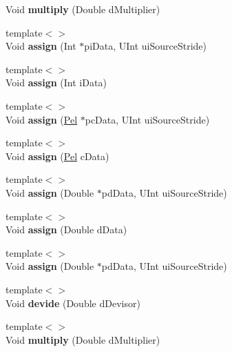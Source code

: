 \begin{DoxyCompactItemize}
\mbox{\label{class_t_ren_image_plane_a2683e03f247a092b64f85d0faabbd030}} 
Void {\bfseries multiply} (Double d\+Multiplier)
\item 
\mbox{\label{class_t_ren_image_plane_a7f27f570150b2743b96889c76ccccaf3}} 
{\footnotesize template$<$$>$ }\\Void {\bfseries assign} (Int $\ast$pi\+Data, U\+Int ui\+Source\+Stride)
\item 
\mbox{\label{class_t_ren_image_plane_a9ac78ccea4fe63cddb4bd99f354246c7}} 
{\footnotesize template$<$$>$ }\\Void {\bfseries assign} (Int i\+Data)
\item 
\mbox{\label{class_t_ren_image_plane_aaee73faf0e840d89aa271ea67e71f5ac}} 
{\footnotesize template$<$$>$ }\\Void {\bfseries assign} (\hyperlink{_type_def_8h_af92141699657699b4b547be0c8517541}{Pel} $\ast$pc\+Data, U\+Int ui\+Source\+Stride)
\item 
\mbox{\label{class_t_ren_image_plane_a4ee1358fe831ce347fadd32b8e6cce35}} 
{\footnotesize template$<$$>$ }\\Void {\bfseries assign} (\hyperlink{_type_def_8h_af92141699657699b4b547be0c8517541}{Pel} c\+Data)
\item 
\mbox{\label{class_t_ren_image_plane_a8b44044a076d0a04290d30fa3db4f78e}} 
{\footnotesize template$<$$>$ }\\Void {\bfseries assign} (Double $\ast$pd\+Data, U\+Int ui\+Source\+Stride)
\item 
\mbox{\label{class_t_ren_image_plane_afb78a2d793ae8042558ed0a171b40d00}} 
{\footnotesize template$<$$>$ }\\Void {\bfseries assign} (Double d\+Data)
\item 
\mbox{\label{class_t_ren_image_plane_ae753b032c765fc46e2602b0bc1f2670f}} 
{\footnotesize template$<$$>$ }\\Void {\bfseries assign} (Double $\ast$pd\+Data, U\+Int ui\+Source\+Stride)
\item 
\mbox{\label{class_t_ren_image_plane_abb92f9bf725f672ffcfda6afa5973c1f}} 
{\footnotesize template$<$$>$ }\\Void {\bfseries devide} (Double d\+Devisor)
\item 
\mbox{\label{class_t_ren_image_plane_a3d7f5c92b829aece6f983d43bc94f2ba}} 
{\footnotesize template$<$$>$ }\\Void {\bfseries multiply} (Double d\+Multiplier)
\end{DoxyCompactItemize}
